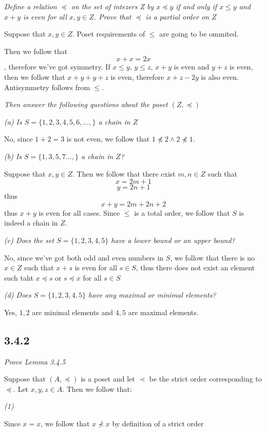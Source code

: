 \documentclass[11pt,oneside,titlepage]{book}
\begin{document}
\textit{Define a relation $\preceq$ on the set of intezers Z by $x \preceq y$ if and only if
  $x \leq y$ and $x + y$ is even for all $x, y \in Z$. Prove that $\preceq$ is a partial order
  on $Z$}

Suppose that $x, y \in Z$. Poset requirements of $\leq$ are going to be ommited.

Then we follow that $$x + x = 2x$$, therefore we've got symmetry.
If $x \leq y$, $y \leq z$, $x + y$ is even and $y + z$ is even, then we follow that
$x + y + y + z$ is even, therefore $x + z - 2y$ is also even.
Antisymmetry follows from $\leq$.

\textit{Then answer the following questions about the poset $(Z, \preceq)$}

\textit{(a) Is $S = \{1, 2, 3, 4, 5, 6, ..., \}$ a chain in $Z$}

No, since $1 + 2 = 3$ is not even, we follow that $1 \not \preceq 2 \land 2 \not \preceq 1$.

\textit{(b) Is $S = \{1, 3, 5, 7 ...,\}$ a chain in $Z$?}

Suppose that $x, y \in Z$. Then we follow that there exist $m, n \in Z$ such that
$$x = 2m + 1$$
$$y = 2n + 1$$
thus
$$x + y = 2m + 2n + 2$$
thus $x + y$ is even for all cases. Since $\leq$ is a total order, we follow that $S$ is
indeed a chain in $Z$.

\textit{(c) Does the  set $S = \{1, 2, 3, 4, 5\}$ have a lower bound or an upper bound?}

No, since we've got both odd and even numbers in $S$, we follow that there is no $x \in Z$ such that
$x + s$ is even for all $s \in S$, thus there does not exist an element such taht
$x \preceq s$ or $s \preceq x$ for all $s \in S$

\textit{(d) Does $S = \{1, 2, 3, 4, 5\}$ have any maximal or minimal elements?}

Yes, $1, 2$ are minimal elements and $4, 5$ are maximal elements.


\subsection*{3.4.2}

\textit{Prove Lemma 3.4.5}

Suppose that $(A, \preceq)$ is a poset and let $\prec$ be the strict order corresponding to
$\preceq$. Let $x, y, z \in A$. Then we follow that:

\textit{(1)}

Since $x = x$, we follow that $x \not \prec x$ by definition of a strict order
\end{document}
